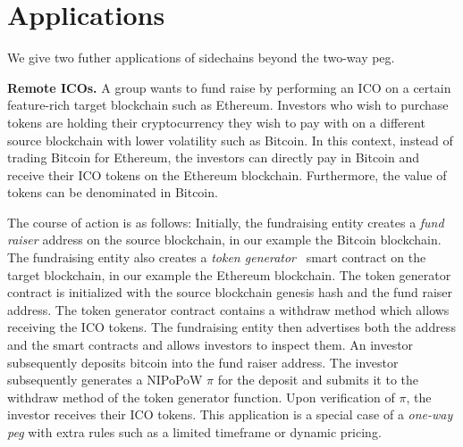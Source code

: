 \section{Applications}

We give two futher applications of sidechains beyond the two-way peg.

\noindent
\textbf{Remote ICOs. } A group wants to fund raise by performing an
ICO \cite{ico} on a certain feature-rich target blockchain such as
Ethereum. Investors who wish to purchase tokens are holding their cryptocurrency
they wish to pay with on a different source blockchain with lower
volatility such as Bitcoin. In this context, instead of trading Bitcoin for
Ethereum, the investors can directly pay in Bitcoin and receive their ICO tokens
on the Ethereum blockchain. Furthermore, the value of tokens can be denominated
in Bitcoin.

The course of action is as follows: Initially, the fundraising entity creates a
\emph{fund raiser} address on the source blockchain, in our example the
Bitcoin blockchain. The fundraising entity also creates a
\emph{token generator}~\cite{openzeppelin-crowdsale} smart contract on the
target blockchain, in our example the Ethereum blockchain. The
token generator contract is initialized with the source blockchain
genesis hash and the fund raiser address. The token generator contract contains
a \textsf{withdraw} method which allows receiving the ICO tokens. The fundraising
entity then advertises both the address and the smart contracts and allows
investors to inspect them. An investor subsequently deposits bitcoin into the
fund raiser address. The investor subsequently generates a NIPoPoW $\pi$
for the deposit and submits it to the \textsf{withdraw} method of the token
generator function. Upon verification of $\pi$, the investor receives their ICO
tokens. This application is a special case of a \emph{one-way peg} with
extra rules such as a limited timeframe or dynamic pricing.

